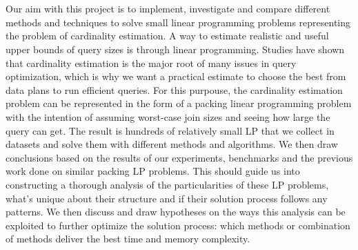 \chapter{\abstractname}

Our aim with this project is to implement, 
investigate and compare different methods 
and techniques to solve small linear programming problems representing
 the problem of cardinality estimation. A way to estimate realistic and
useful upper bounds of query sizes is through linear programming.
 Studies have 
shown that cardinality estimation is the major root of many issues in 
query optimization, which is why we want a 
practical estimate to choose
the best from data plans to run efficient queries.
For this purpouse, the cardinality
estimation problem can be represented in the form of a packing linear programming problem with
the intention of assuming worst-case join sizes and seeing how
large the query can get. The result is
hundreds of relatively small LP that we collect in datasets and solve them 
with different methods and algorithms. We then draw conclusions based on the results of
our experiments, benchmarks and the previous work done on similar packing LP problems.
This should guide us into constructing a thorough analysis of the particularities of
these LP problems, what's unique about their structure and if their solution
process follows any patterns. We then discuss and draw hypotheses on the ways this 
analysis can be exploited to further optimize the solution process: which methods or 
combination of methods deliver the best time and memory complexity.



